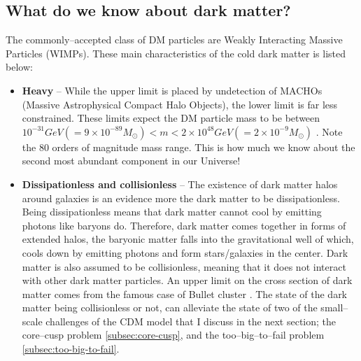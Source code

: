 \documentclass[paper=a4, fontsize=11pt]{scrartcl} %
\numberwithin{equation}{section} %
\numberwithin{figure}{section} %
\numberwithin{table}{section} %
\newcommand{\ignore}[1]{}
\begin{document}
\subsection{What do we know about dark matter?}
\label{subsec:current state}
The commonly--accepted class of DM particles are Weakly Interacting Massive Particles (WIMPs). These main characteristics of the cold dark matter is listed below:
  \begin{itemize}
  \item {\bf Heavy} -- \ignore{The observational upper and lower bounds for dark matter particles come from different sources. }While the upper limit is placed by undetection of MACHOs (Massive Astrophysical Compact Halo Objects), the lower limit is far less constrained.\ignore{ Neither the Kepler satellite \citep[][]{Griest+2014}, nor microlensing surveys \citep[][]{Alcock+1998, Yoo+2004} did not detect MACHOs as predicted.} These limits expect the DM particle mass to be between $10^\mathrm{-31} GeV (= 9\times 10^\mathrm{-89} M_\odot) < m < 2\times 10^\mathrm{48} GeV (= 2 \times 10^\mathrm{-9} M_\odot)$ \citep[\ignore{47 for lower bound}][\ignore{ and 42 \& 43 for the upper bound}]{Hu+2000, Alcock+1998, Yoo+2004}. Note the 80 orders of magnitude mass range. This is how much we know about the second most abundant component in our Universe!
  \item {\bf Dissipationless and collisionless} -- The existence of dark matter halos around galaxies is an evidence more the dark matter to be dissipationless. Being dissipationless means that dark matter cannot cool by emitting photons like baryons do. Therefore, dark matter comes together in forms of extended halos, the baryonic matter falls into the gravitational well of which, cools down by emitting photons and form stars/galaxies in the center. Dark matter is also assumed to be collisionless, meaning that it does not interact with other dark matter particles. An upper limit on the cross section of dark matter comes from the famous case of Bullet cluster \citep[][]{Clowe+2006}. The state of the dark matter being collisionless or not, can alleviate the state of two of the small--scale challenges of the CDM model that I discuss in the next section; the core--cusp problem \ref{subsec:core-cusp}, and the too--big--to--fail problem \ref{subsec:too-big-to-fail}.


\end{itemize}
\end{document}
